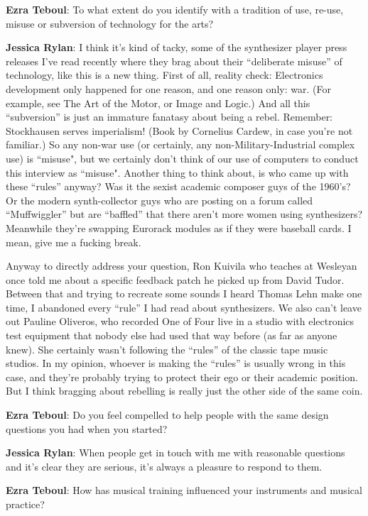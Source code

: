 \textbf{Ezra Teboul}: To what extent do you identify with a tradition of use, re-use, misuse or subversion of technology for the arts? 
                  
\textbf{Jessica Rylan}: I think it's kind of tacky, some of the synthesizer player press releases I've read recently where they brag about their ``deliberate misuse'' of technology, like this is a new thing. First of all, reality check: Electronics development only happened for one reason, and one reason only: war. (For example, see The Art of the Motor, or Image and Logic.) And all this ``subversion'' is just an immature fanatasy about being a rebel. Remember: Stockhausen serves imperialism! (Book by Cornelius Cardew, in case you're not familiar.) So any non-war use (or certainly, any non-Military-Industrial complex use) is ``misuse", but we certainly don't think of our use of computers to conduct this interview as ``misuse". Another thing to think about, is who came up with these ``rules'' anyway? Was it the sexist academic composer guys of the 1960's? Or the modern synth-collector guys who are posting on a forum called ``Muffwiggler'' but are ``baffled'' that there aren't more women using synthesizers? Meanwhile they're swapping Eurorack modules as if they were baseball cards. I mean, give me a fucking break.

Anyway to directly address your question, Ron Kuivila who teaches at Wesleyan once told me about a specific feedback patch he picked up from David Tudor. Between that and trying to recreate some sounds I heard Thomas Lehn make one time, I abandoned every ``rule'' I had read about synthesizers. We also can't leave out Pauline Oliveros, who recorded One of Four live in a studio with electronics test equipment that nobody else had used that way before (as far as anyone knew). She certainly wasn't following the ``rules'' of the classic tape music studios. In my opinion, whoever is making the ``rules'' is usually wrong in this case, and they're probably trying to protect their ego or their academic position. But I think bragging about rebelling is really just the other side of the same coin. 
 
\textbf{Ezra Teboul}: Do you feel compelled to help people with the same design questions you had when you started? 
                  
\textbf{Jessica Rylan}: When people get in touch with me with reasonable questions and it's clear they are serious, it's always a pleasure to respond to them. 
 
\textbf{Ezra Teboul}: How has musical training influenced your instruments and musical practice? 
                  
